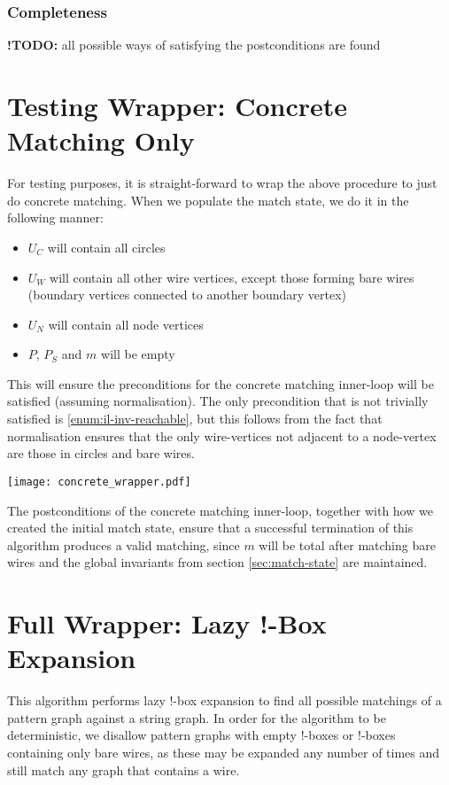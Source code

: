 \documentclass{article}
\newcommand{\TODOinline}[1]{%
\typeout{WARNING!!! there is still a TODO left}
{\color{blue}\textbf{!TODO: }#1}
}
\begin{document}
\subsubsection{Completeness}

\TODOinline{all possible ways of satisfying the postconditions are found}
\section{Testing Wrapper: Concrete Matching Only}
\label{sec:test-wrapper}

For testing purposes, it is straight-forward to wrap the above procedure to just do concrete matching.  When we populate the match state, we do it in the following manner:
\begin{itemize}
\item $U_C$ will contain all circles
\item $U_W$ will contain all other wire vertices, except those forming bare wires (boundary vertices connected to another boundary vertex)
\item $U_N$ will contain all node vertices
\item $P$, $P_S$ and $m$ will be empty
\end{itemize}

This will ensure the preconditions for the concrete matching inner-loop will be satisfied (assuming normalisation).  The only precondition that is not trivially satisfied is \ref{enum:il-inv-reachable}, but this follows from the fact that normalisation ensures that the only wire-vertices not adjacent to a node-vertex are those in circles and bare wires.

\begin{center}
  \texttt{[image: concrete\_wrapper.pdf]}
\end{center}

The postconditions of the concrete matching inner-loop, together with how we created the initial match state, ensure that a successful termination of this algorithm produces a valid matching, since $m$ will be total after matching bare wires and the global invariants from section \ref{sec:match-state} are maintained.

\section{Full Wrapper: Lazy !-Box Expansion}
\label{sec:full-wrapper}

This algorithm performs lazy $!$-box expansion to find all possible matchings of a pattern graph against a string graph.  In order for the algorithm to be deterministic, we disallow pattern graphs with empty $!$-boxes or $!$-boxes containing only bare wires, as these may be expanded any number of times and still match any graph that contains a wire.
\end{document}
